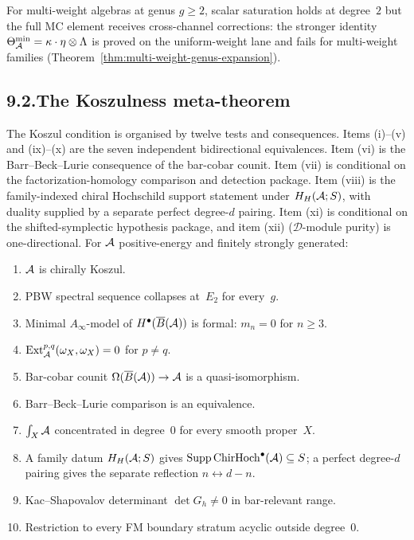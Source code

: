 For multi-weight algebras at genus $g\ge 2$, scalar saturation
holds at degree~$2$ but the full MC element receives
cross-channel corrections: the stronger identity
$\Theta_{\mathcal{A}}^{\mathrm{min}}=\kappa\cdot\eta\otimes\Lambda$ is
proved on the uniform-weight lane and fails for multi-weight
families (Theorem~\ref{thm:multi-weight-genus-expansion}).

\subsection*{9.2.\enspace The Koszulness meta-theorem}

The Koszul condition is organised by twelve tests and
consequences. Items \textup{(i)--(v)} and \textup{(ix)--(x)}
are the seven independent bidirectional equivalences. Item
\textup{(vi)} is the Barr--Beck--Lurie consequence of the
bar-cobar counit. Item \textup{(vii)} is conditional on the
factorization-homology comparison and detection package. Item
\textup{(viii)} is the family-indexed chiral Hochschild support
statement under $H_H(\mathcal{A};S)$, with duality supplied by a separate
perfect degree-$d$ pairing. Item \textup{(xi)} is conditional on the
shifted-symplectic hypothesis package, and item \textup{(xii)}
($\mathcal D$-module purity) is one-directional. For $\mathcal{A}$
positive-energy and finitely strongly generated:

\begin{enumerate}[label=\textup{(\roman*)},nosep]
\item $\mathcal{A}$ is chirally Koszul.
\item PBW spectral sequence collapses at~$E_2$ for every~$g$.
\item Minimal $A_\infty$-model of $H^\bullet(\overline{B}(\mathcal{A}))$
 is formal: $m_n = 0$ for $n \geq 3$.
\item $\operatorname{Ext}^{p,q}_{\mathcal{A}}(\omega_X, \omega_X) = 0$
 for $p \neq q$.
\item Bar-cobar counit
 $\Omega(\overline{B}(\mathcal{A})) \to \mathcal{A}$ is a quasi-isomorphism.
\item Barr--Beck--Lurie comparison is an equivalence.
\item $\int_X \mathcal{A}$ concentrated in degree~$0$
 for every smooth proper~$X$.
\item A family datum $H_H(\mathcal{A};S)$ gives
 $\operatorname{Supp}\mathrm{ChirHoch}^\bullet(\mathcal{A})\subseteq S$;
 a perfect degree-$d$ pairing gives the separate reflection
 $n\leftrightarrow d-n$.
\item Kac--Shapovalov determinant $\det G_h \neq 0$
 in bar-relevant range.
\item Restriction to every FM boundary stratum acyclic
 outside degree~$0$.
\end{enumerate}

